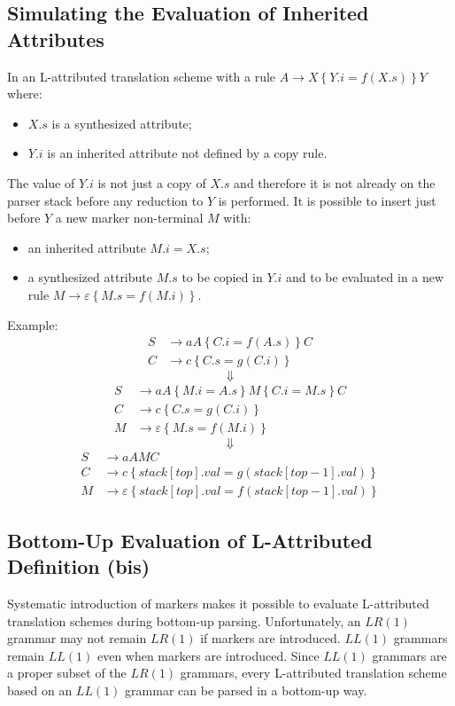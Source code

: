\subsection{Simulating the Evaluation of Inherited Attributes}
In an L-attributed translation scheme with a rule $A \to X\left\{Y.i = f(X.s)\right\}Y$ where:
\begin{itemize}
    \item $X.s$ is a synthesized attribute;
    \item $Y.i$ is an inherited attribute not defined by a copy rule.
\end{itemize}
The value of $Y.i$ is not just a copy of $X.s$ and therefore it is not already on the parser stack before any reduction to $Y$ is performed.
It is possible to insert just before $Y$ a new marker non-terminal $M$ with:
\begin{itemize}
    \item an inherited attribute $M.i = X.s$;
    \item a synthesized attribute $M.s$ to be copied in $Y.i$ and to be evaluated in a new rule $M \to \varepsilon \left\{M.s = f(M.i)\right\}$.
\end{itemize}
Example:
\begin{align*}
    S &\to aA \left\{C.i = f(A.s)\right\}C \\
    C &\to c \left\{C.s = g(C.i)\right\}
\end{align*}
$$
    \Downarrow
$$
\begin{align*}
    S &\to aA \left\{M.i = A.s\right\}M\left\{C.i = M.s\right\}C \\
    C &\to c \left\{C.s = g(C.i)\right\} \\
    M &\to \varepsilon \left\{M.s = f(M.i)\right\}
\end{align*}
$$
    \Downarrow
$$
\begin{align*}
    S &\to aAMC \\
    C &\to c \left\{stack[top].val = g(stack[top - 1].val)\right\} \\
    M &\to \varepsilon \left\{stack[top].val = f(stack[top - 1].val)\right\}
\end{align*}

\subsection{Bottom-Up Evaluation of L-Attributed Definition (bis)}
Systematic introduction of markers makes it possible to evaluate L-attributed translation schemes during bottom-up parsing.
Unfortunately, an $LR(1)$ grammar may not remain $LR(1)$ if markers are introduced.
$LL(1)$ grammars remain $LL(1)$ even when markers are introduced.
Since $LL(1)$ grammars are a proper subset of the $LR(1)$ grammars, every L-attributed translation scheme based on an $LL(1)$ grammar can be parsed in a bottom-up way.